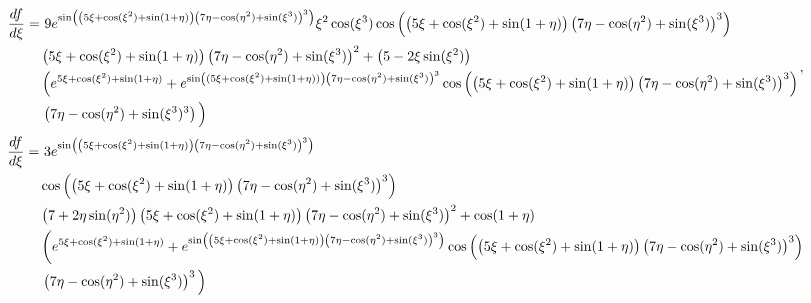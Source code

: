 \begin{landscape}   
    \begin{equation}
        \begin{split}
            \frac{df}{d\xi} =& ~9 e^{\sin\left(\left(5\xi + \cos(\xi^2) + \sin(1 +\eta)\right) \left(7\eta - \cos(\eta^2) + \sin(\xi^3) \right)^3\right)} \xi^2 \cos(\xi^3) \cos\left(\left(5\xi + \cos(\xi^2) + \sin(1+\eta) \right) \left(7\eta - \cos(\eta^2) + \sin(\xi^3) \right)^3\right)\\
            &\left(5\xi + \cos(\xi^2) + \sin(1 + \eta)\right)\left(7\eta - \cos(\eta^2) + \sin(\xi^3)\right)^2 + \left(5 - 2\xi\sin(\xi^2)\right)\\
            &\left(e^{5\xi + \cos(\xi^2) + \sin(1 + \eta)} + e^{\sin\left((5\xi + \cos(\xi^2) + \sin(1 + \eta))\right) \left(7\eta -\cos(\eta^2) +\sin(\xi^3) \right)^3}\cos\left(\left(5\xi +\cos(\xi^2) + \sin(1 + \eta)\right) \left(7\eta - \cos(\eta^2) + \sin(\xi^3) \right)^3 \right)\right.\\
            &\left. \left(7 \eta - \cos(\eta^2) + \sin(\xi^3)^3\right) \vphantom{e^{{5\xi + \cos(\xi^2) + \sin(1 + \eta)}}}\right)
        \end{split},
    \end{equation}
    \begin{equation}
        \begin{split}
            \frac{df}{d\xi} =& ~3e^{\sin\left(\left(5\xi + \cos(\xi^2) + \sin(1 + \eta) \right)\left(7 \eta - \cos(\eta^2) +\sin(\xi^3) \right)^3 \right)} \\
            & \cos\left(\left(5\xi + \cos(\xi^2) + \sin(1 + \eta) \right)\left(7\eta -\cos(\eta^2)+\sin(\xi^3)\right)^3 \right) \\
            & \left(7 + 2\eta \sin(\eta^2)\right)\left(5\xi +\cos(\xi^2) +\sin(1 +\eta)\right)\left(7\eta -\cos(\eta^2) + \sin(\xi^3) \right)^2 + \cos(1 + \eta)\\
            & \left(e^{5\xi + \cos(\xi^2) + \sin(1 + \eta)} + e^{\sin\left(\left(5\xi + \cos(\xi^2) +\sin(1+\eta)\right)\left(7\eta -\cos(\eta^2)+\sin(\xi^3)\right)^3\right)}\cos\left(\left(5\xi + \cos(\xi^2) + \sin(1+\eta)\right) \left(7\eta - \cos(\eta^2) + \sin(\xi^3)\right)^3\right)\right.\\
            &\left. \left(7\eta - \cos(\eta^2) + \sin(\xi^3)\right)^3 \vphantom{e^{5\xi + \cos(\xi^2) + \sin(1 + \eta)}}\right)
        \end{split}
    \end{equation}

\end{landscape}